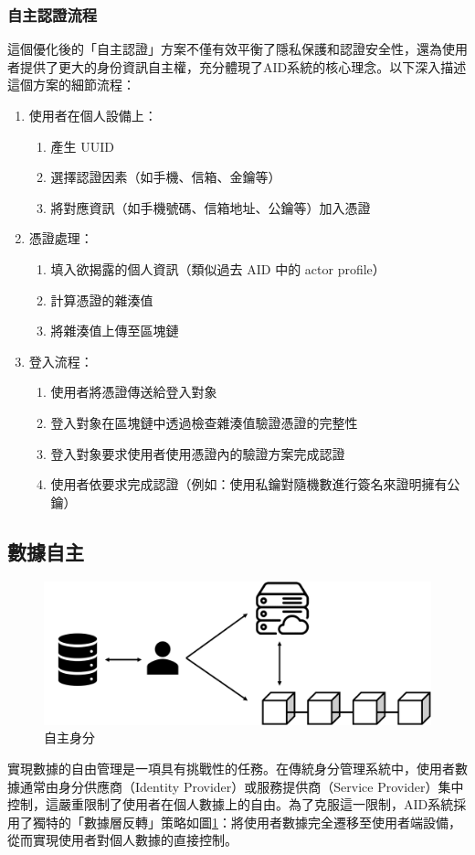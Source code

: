 \subsubsection{自主認證流程}
這個優化後的「自主認證」方案不僅有效平衡了隱私保護和認證安全性，還為使用者提供了更大的身份資訊自主權，充分體現了AID系統的核心理念。以下深入描述這個方案的細節流程：
\begin{enumerate}
  \item 使用者在個人設備上：
        \begin{enumerate}
          \item 產生 UUID
          \item 選擇認證因素（如手機、信箱、金鑰等）
          \item 將對應資訊（如手機號碼、信箱地址、公鑰等）加入憑證
        \end{enumerate}

  \item 憑證處理：
        \begin{enumerate}
          \item 填入欲揭露的個人資訊（類似過去 AID 中的 actor profile）
          \item 計算憑證的雜湊值
          \item 將雜湊值上傳至區塊鏈
        \end{enumerate}

  \item 登入流程：
        \begin{enumerate}
          \item 使用者將憑證傳送給登入對象
          \item 登入對象在區塊鏈中透過檢查雜湊值驗證憑證的完整性
          \item 登入對象要求使用者使用憑證內的驗證方案完成認證
          \item 使用者依要求完成認證（例如：使用私鑰對隨機數進行簽名來證明擁有公鑰）
        \end{enumerate}
\end{enumerate}
\subsection{數據自主}
\begin{figure}
  \centering
  \includegraphics[width=\linewidth,keepaspectratio]{figures/aid.png}
  \caption{自主身分}
  \label{fig:aid}
\end{figure}
實現數據的自由管理是一項具有挑戰性的任務。在傳統身分管理系統中，使用者數據通常由身分供應商（Identity Provider）或服務提供商（Service Provider）集中控制，這嚴重限制了使用者在個人數據上的自由。為了克服這一限制，AID系統採用了獨特的「數據層反轉」策略如圖\ref{fig:aid}：將使用者數據完全遷移至使用者端設備，從而實現使用者對個人數據的直接控制。

